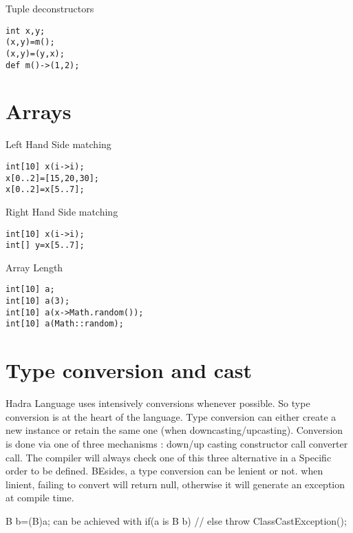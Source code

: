 \documentclass{tufte-book}
\begin{document}
            Tuple deconstructors
            \begin{lstlisting}
int x,y;
(x,y)=m();
(x,y)=(y,x);
def m()->(1,2);
            \end{lstlisting}

            \section{Arrays}

                Left Hand Side matching
                \begin{lstlisting}
int[10] x(i->i);
x[0..2]=[15,20,30];
x[0..2]=x[5..7];
                \end{lstlisting}


                Right Hand Side matching
                \begin{lstlisting}
int[10] x(i->i);
int[] y=x[5..7];
                \end{lstlisting}

                Array Length
                \begin{lstlisting}
int[10] a;
int[10] a(3);
int[10] a(x->Math.random());
int[10] a(Math::random);
                \end{lstlisting}

            \section{Type conversion and cast}
            Hadra Language uses intensively conversions whenever possible. So type conversion is at the heart of the language.
            Type conversion can either create a new instance or retain the same one (when downcasting/upcasting).
            Conversion is done via one of three mechanisms :
            down/up casting
            constructor call
            converter call.
            The compiler will always check one of this three alternative in a Specific order to be defined.
            BEsides, a type conversion can be lenient or not. when linient, failing to convert will return null, otherwise it will generate an exception at compile time.
            
            B b=(B)a;
            can be achieved with
            if(a is B b){
              //
            }else{
                throw ClassCastException();
            }
            
\end{document}
